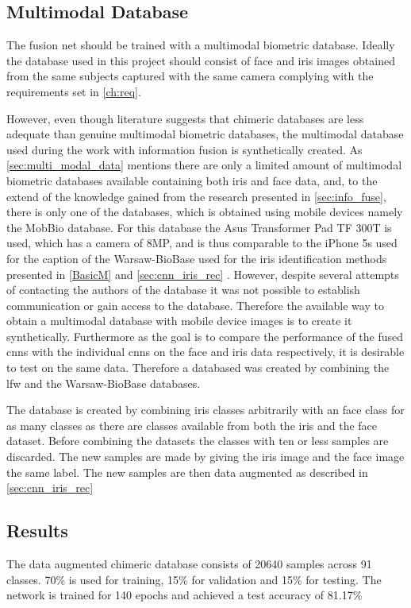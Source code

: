 \clearpage
\subsection{Multimodal Database}
The fusion net should be trained with a multimodal biometric database. Ideally the database used in this project should consist of face and iris images obtained from the same subjects captured with the same camera complying with the requirements set in \autoref{ch:req}. 

However, even though literature suggests that chimeric databases are less adequate than genuine multimodal biometric databases, the multimodal database used during the work with information fusion is synthetically created. As \autoref{sec:multi_modal_data} mentions there are only a limited amount of multimodal biometric databases available containing both iris and face data, and, to the extend of the knowledge gained from the research presented in \autoref{sec:info_fuse}, there is only one of the databases, which is obtained using mobile devices namely the MobBio database. For this database the Asus Transformer Pad TF 300T is used, which has a camera of 8MP, and is thus comparable to the iPhone 5s used for the caption of the Warsaw-BioBase used for the iris identification methods presented in \autoref{BasicM} and \autoref{sec:cnn_iris_rec} \citep{Sequeira2014}. However, despite several attempts of contacting the authors of the database it was not possible to establish communication or gain access to the database. Therefore the available way to obtain a multimodal database with mobile device images is to create it synthetically. Furthermore as the goal is to compare the performance of the fused \gls{cnn}s with the individual \gls{cnn}s on the face and iris data respectively, it is desirable to test on the same data. Therefore a databased was created by combining the \gls{lfw} and the Warsaw-BioBase databases. 

The database is created by combining iris classes arbitrarily with an face class for as many classes as there are classes available from both the iris and the face dataset. Before combining the datasets the classes with ten or less samples are discarded. The new samples are made by giving the iris image and the face image the same label. The new samples are then data augmented as described in \autoref{sec:cnn_iris_rec}

\subsection{Results}
The data augmented chimeric database consists of 20640 samples across 91 classes. 70\% is used for training, 15\% for validation and 15\% for testing. The network is trained for 140 epochs and achieved a test accuracy of 81.17\%

